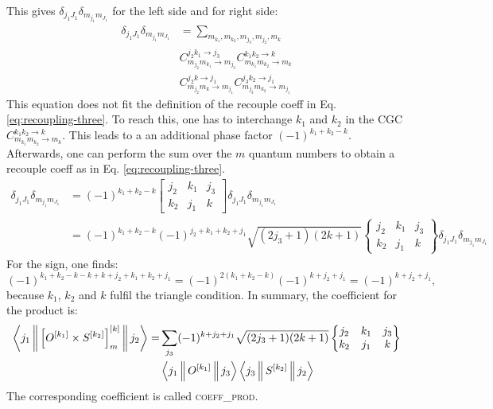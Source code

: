 \documentclass[a4paper,10pt,parskip=full]{scrartcl}
\begin{document}
This gives $\delta_{j_1J_1}\delta_{m_{j_1}m_{J_1}}$ for the left side and for right side:
\begin{equation}
  \begin{split}
    \delta_{j_1J_1}\delta_{m_{j_1}m_{J_1}}  &=
    \sum_{m_{k_1},m_{k_2},m_{j_3},m_{j_2},m_k}\\
    &C^{j_2k_1\rightarrow j_3}_{m_{j_2}m_{k_1}\rightarrow m_{j_3}}
    C^{k_1k_2\rightarrow k}_{m_{k_1}m_{k_2}\rightarrow m_{k}}\\
    &C^{j_2k\rightarrow j_1}_{m_{j_2}m_k\rightarrow m_{j_1}}
    C^{j_3k_2\rightarrow j_1}_{m_{j_3}m_{k_2}\rightarrow m_{j_1}}
  \end{split}
\end{equation}
This equation does not fit the definition of the recouple coeff in Eq. \eqref{eq:recoupling-three}.
To reach this, one has to interchange $k_1$ and $k_2$ in the CGC $C^{k_1k_2\rightarrow k}_{m_{k_1}m_{k_2}\rightarrow m_{k}}$.
This leads to a an additional phase factor $(-1)^{k_1+k_2-k}$.
Afterwards, one can perform the sum over the $m$ quantum numbers to obtain a recouple coeff as in Eq. \eqref{eq:recoupling-three}.
\begin{equation}
  \begin{split}
  \delta_{j_1J_1}\delta_{m_{j_1}m_{J_1}}  &=
  (-1)^{k_1+k_2-k}
  \begin{bmatrix}
    j_2 & k_1 & j_{3} \\
    k_2 & j_1 & k
  \end{bmatrix}\delta_{j_1J_1}\delta_{m_{j_1}m_{J_1}}\\
  &=
  (-1)^{k_1+k_2-k}(-1)^{j_2+k_1+k_2+j_1}\sqrt{(2j_3+1)(2k+1)}
  \begin{Bmatrix}
    j_2 & k_1 & j_{3} \\
    k_2 & j_1 & k
  \end{Bmatrix}\delta_{j_1J_1}\delta_{m_{j_1}m_{J_1}}
  \end{split}
\end{equation}
For the sign, one finds:
\begin{equation}
  (-1)^{k_1+k_2-k-k+k+j_2+k_1+k_2+j_1}=(-1)^{2(k_1+k_2-k)}(-1)^{k+j_2+j_1}=(-1)^{k+j_2+j_1},
\end{equation}
because $k_1$, $k_2$ and $k$ fulfil the triangle condition.
In summary, the coefficient for the product is:
\begin{equation}
  \label{eq:coeff_prod}
  \begin{split}
  \Braket{j_1 ||\left[O^{[k_1]}\times S^{[k_2]}\right]^{[k]}_m||j_2} =& \sum_{j_3}(-1)^{k+j_2+j_1}\sqrt{(2j_3+1)(2k+1)}
  \begin{Bmatrix}
    j_2 & k_1 & j_{3} \\
    k_2 & j_1 & k
  \end{Bmatrix}\\
  &\Braket{j_1||O^{[k_1]}||j_3}\Braket{j_3||S^{[k_2]}||j_2}
  \end{split}
\end{equation}
The corresponding coefficient is called \textsc{coeff\_prod}.
\end{document}
